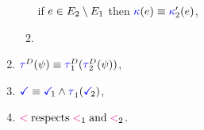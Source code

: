 \begin{figure}
\begin{multicols}{2}
\begin{enumerate}[topsep=0pt,label=(\textsc{s}\arabic*),ref=\textsc{s}\arabic*]
\begin{enumerate}[leftmargin=0pt]
        if $e\in E_2\setminus E_1$ then ${\color{blue}\kappa}(e) \mathrel{\equiv} {\color{blue}\kappa}'_2(e)$, %
      \item \label{seq-kappa12}
      \end{enumerate}
      \columnbreak
    \item \label{seq-tau}
      $\aTr{\bEvs}{\bForm} \riff \aTr[1]{\bEvs}{\aTr[2]{\bEvs}{\bForm}}$,
    \item \label{seq-term}
      $\aTerm \riff \aTerm[1]\land\aTr[1]{}{\aTerm[2]}$,
    \item \label{seq-le}
      ${\lt}\rextends{\lt_1}{\lt_2}$.
    \end{enumerate}
  \end{multicols}
  \medskip


\end{figure}
